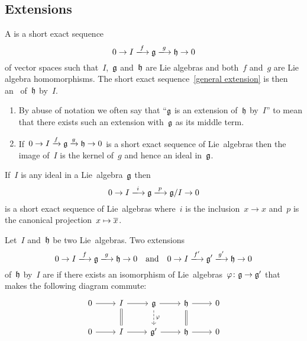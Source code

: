\subsection{Extensions}


\begin{definition}
  A  is a short exact sequence
  \begin{equation}
    \label{general extension}
    0 
    \to
    I
    \xlongto{f}
    \glie
    \xlongto{g}
    \hlie
    \to
    0
  \end{equation}
  of vector spaces such that~$I$,~$\mathfrak{g}$ and~$\mathfrak{h}$ are Lie algebras and both~$f$ and~$g$ are Lie algebra homomorphisms.
  The short exact sequence~\eqref{general extension} is then an~ of~$\mathfrak{h}$ by~$I$.
\end{definition}


\begin{remark}
  \leavevmode
  \begin{enumerate}
    \item
      By abuse of notation we often say that \enquote{$\mathfrak{g}$ is an extension of~$\mathfrak{h}$ by~$I$} to mean that there exists such an extension with~$\mathfrak{g}$ as its middle term.
    \item
      If~$0 \to I \xrightarrow{f} \mathfrak{g} \xrightarrow{g} \mathfrak{h} \to 0$ is a short exact sequence of Lie~algebras then the image of~$I$ is the kernel of~$g$ and hence an ideal in~$\mathfrak{g}$.
  \end{enumerate}
\end{remark}


\begin{example}
  If~$I$ is any ideal in a Lie~algebra~$\mathfrak{g}$ then
  \[
    0
    \to
    I
    \xlongto{i}
    \glie
    \xlongto{p}
    \glie/I
    \to
    0
  \]
  is a short exact sequence of Lie~algebras where~$i$ is the inclusion~$x \to x$ and~$p$ is the canonical projection~$x \mapsto \overline{x}$.
\end{example}


\begin{definition}
  \label{equivalence of extensions}
  Let~$I$ and~$\mathfrak{h}$ be two Lie~algebras.
  Two extensions
  \[
    0 
    \to
    I
    \xlongto{f}
    \glie
    \xlongto{g}
    \hlie
    \to
    0
    \quad\text{and}\quad
    0 
    \to
    I
    \xlongto{f'}
    \glie'
    \xlongto{g'}
    \hlie
    \to
    0
  \]
  of~$\mathfrak{h}$ by~$I$ are  if there exists an isomorphism of Lie~algebras~$\varphi \colon \mathfrak{g} \to \mathfrak{g}'$ that makes the following diagram commute:
  \[
    \begin{tikzcd}
      0
      \arrow{r}
      &
      I
      \arrow{r}
      \arrow[equal]{d}
      &
      \glie
      \arrow{r}
      \arrow[dashed]{d}[right]{\varphi}
      &
      \hlie
      \arrow{r}
      \arrow[equal]{d}
      &
      0
      \\
      0
      \arrow{r}
      &
      I
      \arrow{r}
      &
      \glie'
      \arrow{r}
      &
      \hlie
      \arrow{r}
      &
      0
    \end{tikzcd}
  \]
\end{definition}


